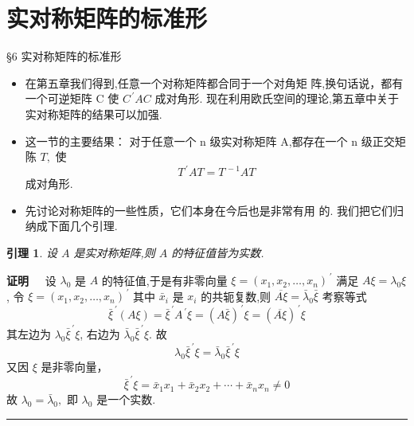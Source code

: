 \documentclass[13pt]{beamer}
\newtheorem{lem}{引理}
\def\qed{\nopagebreak\hfill{\rule{4pt}{7pt}}\medbreak}
\def\pf{{\bf 证明~~ }}
\begin{document}
\section{实对称矩阵的标准形}
\begin{frame}{\S {6}  实对称矩阵的标准形}
\begin{itemize}
\item 在第五章我们得到,任意一个对称矩阵都合同于一个对角矩 阵,换句话说，都有一个可逆矩阵 C 使 ${C}^{\, \prime} {A} {C}$
成对角形.
现在利用欧氏空间的理论,第五章中关于实对称矩阵的结果可以加强.

\item 这一节的主要结果： 对于任意一个 n 级实对称矩阵 A,都存在一个 n 级正交矩陈
${T},$ 使
\[
{T}^{\, \prime} {A} {T}={T}^{\, -1} {A} {T}
\]
成对角形. 

\item 先讨论对称矩阵的一些性质，它们本身在今后也是非常有用
的. 我们把它们归纳成下面几个引理.
\end{itemize}
\end{frame}

\begin{frame}

\begin{lem}
设 $A$ 是实对称矩阵,则 $A$ 的特征值皆为实数. 
\end{lem}
\pf  设 $\lambda_{0}$ 是 ${A}$ 的特征值,于是有非零向量
$\xi=\left(x_{1}, x_{2}, \ldots, x_{n}\right)^{\, \prime}$
满足
${A} {\xi}=\lambda_{0} {\xi}$, 
令
$\xi = \left( {x}_{1}, {x}_{2}, \ldots, {x}_{n} \right)^{\, \prime}$
其中 $\bar{x}_{i}$ 是 $x_{i}$ 的共轭复数,则 $\overline{A \xi}=\bar{\lambda}_{0} \bar{\xi}$
考察等式
\[
\bar{\xi}^{\, \prime}(A \xi)=\bar{\xi}^{\, \prime} A^{\, \prime} \xi=(A \bar{\xi})^{\, \prime} \xi=(\overline{A \xi})^{\, \prime} \xi
\]
其左边为 $\lambda_{0} \bar{\xi}^{\, \prime} \xi$, 右边为 $\bar{\lambda}_{0} \bar{\xi}^{\, \prime} \xi$. 故
\[
\lambda_{0} \bar{\xi}^{\, \prime} \xi = \bar{\lambda}_{0} \bar{\xi}^{\, \prime} \xi
\]
又因 $\xi$ 是非零向量，
\[
\bar{\xi}^{\, \prime} \xi=\bar{x}_{1} x_{1}+\bar{x}_{2} x_{2}+\cdots+\bar{x}_{n} x_{n} \neq 0
\]
故 $\lambda_{0}=\bar{\lambda}_{0},$ 即 $\lambda_{0}$ 是一个实数. 
\qed
\end{frame}
\end{document}
